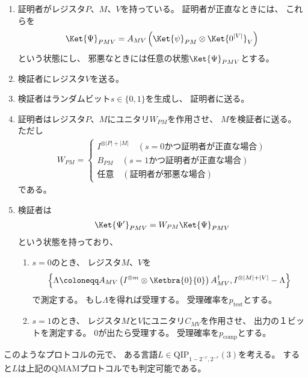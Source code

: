\documentclass[a4paper, 10pt]{jsarticle}
\begin{document}
\begin{enumerate}
	\item 証明者がレジスタ$P$、$M$、$V$を持っている。
	証明者が正直なときには、
	これらを
	\begin{align}
		\Ket{\Psi}_{PMV} =
		A_{MV} \left( \Ket{\psi}_{PM} \otimes \Ket{0^{|V|}}_V \right)
	\end{align}
	という状態にし、
	邪悪なときには任意の状態$\Ket{\Psi}_{PMV}$とする。
	\item 検証者にレジスタ$V$を送る。
	\item 検証者はランダムビット$s \in \{0, 1\}$を生成し、
	証明者に送る。
	\item 証明者はレジスタ$P$、$M$にユニタリ$W_{PM}$を作用させ、
	$M$を検証者に送る。
	ただし
	\begin{align}
		W_{PM} = \begin{cases}
			I^{\otimes |P| + |M|} \quad
			\left( \text{$s=0$かつ証明者が正直な場合} \right) \\
			B_{PM} \quad
			\left( \text{$s=1$かつ証明者が正直な場合} \right) \\
			\text{任意} \quad
			\left( \text{証明者が邪悪な場合} \right)
		\end{cases}
	\end{align}
	である。
	\item 検証者は
	\begin{align}
		\Ket{\Psi'}_{PMV}
		= W_{PM} \Ket{\Psi}_{PMV}
	\end{align}
	という状態を持っており、
	\begin{enumerate}
		\item $s = 0$のとき、
		レジスタ$M$、$V$を
		\begin{align}
			\left\{ 
				\Lambda \coloneqq A_{MV}
				\left( I^{\otimes m} \otimes \Ketbra{0}{0} \right)
				A_{MV}^\dagger,
				I^{\otimes |M| + |V|} - \Lambda
			 \right\}
		\end{align}
		で測定する。
		もし$\Lambda$を得れば受理する。
		受理確率を$p_\mathrm{test}$とする。
		\item $s = 1$のとき、
		レジスタ$M$と$V$にユニタリ$C_{MV}$を作用させ、
		出力の１ビットを測定する。
		0が出たら受理する。
		受理確率を$p_\mathrm{comp}$とする。
	\end{enumerate}
\end{enumerate}

このようなプロトコルの元で、
ある言語$L \in \mathrm{QIP}_{1-2^{-r}, 2^{-r}}(3)$を考える。
すると$L$は上記のQMAMプロトコルでも判定可能である。
\end{document}
